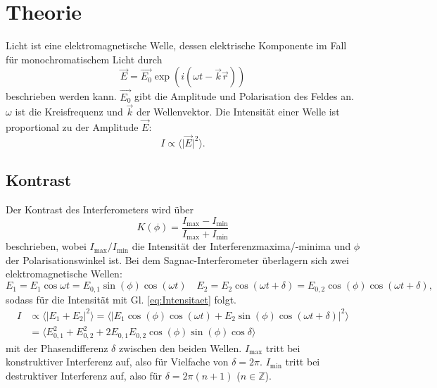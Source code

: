 \section{Theorie}
\label{sec:Theorie}

Licht ist eine elektromagnetische Welle, 
dessen elektrische Komponente im Fall für monochromatischem Licht durch
\begin{equation}
  \label{eq:Welle}
  \vec{E}=\vec{E_0}\exp{\left(i (\omega t-\vec{k}\vec{r})\right)}
\end{equation}
beschrieben werden kann. 
$\vec{E_0}$ gibt die Amplitude und Polarisation des Feldes
an.
$\omega$ ist die Kreisfrequenz und  $\vec{k}$ der Wellenvektor.
Die Intensität einer Welle ist proportional zu der Amplitude $\vec{E}$:
\begin{equation}
  \label{eq:Intensitaet}
  I \propto \langle \lvert \vec{E} \rvert^2 \rangle.
\end{equation} 


\subsection{Kontrast}%
Der Kontrast des Interferometers wird über 
\begin{equation}
  K(\phi)= \frac{I_{\text{max}}-I_{\text{min}}}{I_{\text{max}}+I_{\text{min}}}
  \label{eq:Kontrast}
\end{equation}
beschrieben, 
wobei $I_{\text{max}} / I_{\text{min}}$ die Intensität der Interferenzmaxima/-minima 
und $\phi$ der Polarisationswinkel ist. 
\newline \newline
\noindent Bei dem Sagnac-Interferometer überlagern sich zwei elektromagnetische Wellen:
\begin{equation}
  E_1 = E_{1} \cos{\omega t} = E_{0,1} \sin(\phi) \cos{(\omega t)} \quad 
  E_2 = E_{2} \cos{(\omega t + \delta) } =E_{0,2} \cos(\phi)  \cos{(\omega t + \delta) } ,
\end{equation}
\noindent sodass für die Intensität mit Gl. \eqref{eq:Intensitaet} folgt.
\begin{align}
  I &\propto \langle \lvert
  E_1+E_2 \rvert^2 \rangle =
  \langle \lvert E_1 \cos{(\phi)}\cos{(\omega t)} + E_2 \sin{(\phi)}\cos{(\omega t + \delta)} \rvert^2 \rangle \\
  &=  \langle E_{0,1}^2 + E_{0,2}^2 + 2E_{0,1}E_{0,2}\cos(\phi)\sin(\phi)\cos{\delta}  \rangle
\end{align}
mit der Phasendifferenz $\delta$ zwischen den beiden Wellen.
$I_{\text{max}}$ tritt bei konstruktiver Interferenz auf,
also für Vielfache von $\delta = 2\pi$.
$I_{\text{min}}$ tritt bei destruktiver Interferenz auf,
also für $\delta = 2\pi(n+1)$ ($n \in \mathbb{Z} $).

